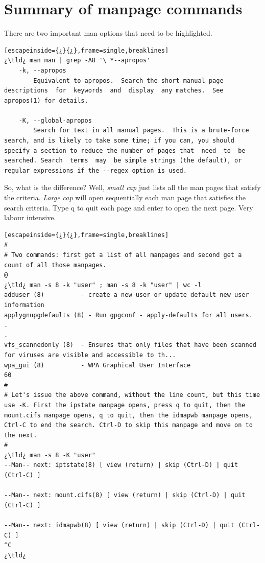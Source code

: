 \section{Summary of manpage commands}

There are two important man options that need to be highlighted.

\begin{lstlisting}[escapeinside={¿}{¿},frame=single,breaklines]
¿\tld¿ man man | grep -A8 '\ *--apropos'
	-k, --apropos
		Equivalent to apropos.  Search the short manual page  descriptions  for  keywords  and  display  any matches.  See apropos(1) for details.

	-K, --global-apropos
		Search for text in all manual pages.  This is a brute-force search, and is likely to take some time; if you can, you should specify a section to reduce the number of pages that  need  to  be  searched. Search  terms  may  be simple strings (the default), or regular expressions if the --regex option is used.		
\end{lstlisting}

So, what is the difference? Well, \emph{small cap}  just lists all the man pages that satisfy the criteria. \emph{Large cap}  will open sequentially each man page that satisfies the search criteria. Type q to quit each page and enter to open the next page. Very labour intensive.

\begin{lstlisting}[escapeinside={¿}{¿},frame=single,breaklines]
#
# Two commands: first get a list of all manpages and second get a count of all those manpages.
@
¿\tld¿ man -s 8 -k "user" ; man -s 8 -k "user" | wc -l
adduser (8)          - create a new user or update default new user information
applygnupgdefaults (8) - Run gpgconf - apply-defaults for all users.
.
.
vfs_scannedonly (8)  - Ensures that only files that have been scanned for viruses are visible and accessible to th...
wpa_gui (8)          - WPA Graphical User Interface
60
#
# Let's issue the above command, without the line count, but this time use -K. First the ipstate manpage opens, press q to quit, then the mount.cifs manpage opens, q to quit, then the idmapwb manpage opens, Ctrl-C to end the search. Ctrl-D to skip this manpage and move on to the next.
#
¿\tld¿ man -s 8 -K "user"
--Man-- next: iptstate(8) [ view (return) | skip (Ctrl-D) | quit (Ctrl-C) ]

--Man-- next: mount.cifs(8) [ view (return) | skip (Ctrl-D) | quit (Ctrl-C) ]

--Man-- next: idmapwb(8) [ view (return) | skip (Ctrl-D) | quit (Ctrl-C) ]
^C
¿\tld¿
\end{lstlisting}


